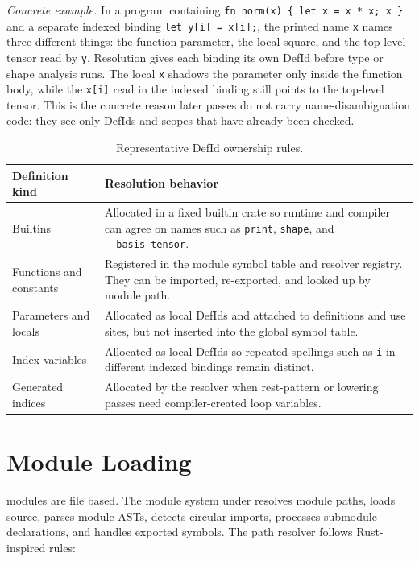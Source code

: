 \textit{Concrete example.} In a program containing \texttt{fn norm(x) \{ let
x = x * x; x \}} and a separate indexed binding \texttt{let y[i] = x[i];}, the
printed name \texttt{x} names three different things: the function parameter,
the local square, and the top-level tensor read by \texttt{y}. Resolution gives
each binding its own DefId before type or shape analysis runs. The local
\texttt{x} shadows the parameter only inside the function body, while the
\texttt{x[i]} read in the indexed binding still points to the top-level tensor.
This is the concrete reason later passes do not carry name-disambiguation code:
they see only DefIds and scopes that have already been checked.

\begin{table}[htbp]
\centering
\caption{Representative DefId ownership rules.}
\label{tab:defid-rules}
\renewcommand{\arraystretch}{1.08}
\begin{tabular}{@{}L{0.26\textwidth}L{0.62\textwidth}@{}}
\toprule
Definition kind & Resolution behavior \\
\midrule
Builtins & Allocated in a fixed builtin crate so runtime and compiler can agree on names such as \texttt{print}, \texttt{shape}, and \texttt{\_\_basis\_tensor}. \\
Functions and constants & Registered in the module symbol table and resolver registry. They can be imported, re-exported, and looked up by module path. \\
Parameters and locals & Allocated as local DefIds and attached to definitions and use sites, but not inserted into the global symbol table. \\
Index variables & Allocated as local DefIds so repeated spellings such as \texttt{i} in different indexed bindings remain distinct. \\
Generated indices & Allocated by the resolver when rest-pattern or lowering passes need compiler-created loop variables. \\
\bottomrule
\end{tabular}
\end{table}

\section{Module Loading}

\einlang{} modules are file based. The module system under
 resolves module paths, loads
source, parses module ASTs, detects circular imports, processes submodule
declarations, and handles exported symbols. The path resolver follows
Rust-inspired rules:

